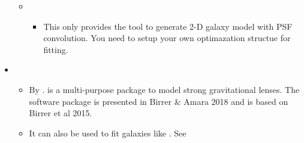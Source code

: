 \documentclass[letterpaper,10pt,english]{sphinxmanual}
\begin{document}
\begin{itemize}
\begin{itemize}
\item {} 
\begin{itemize}
\item {} 
This only provides the tool to generate 2-D galaxy model with
PSF convolution. You need to setup your own optimazation
structue for fitting.

\end{itemize}

\end{itemize}

\item {} 
\begin{itemize}
\item {} 
By .
 is a multi-purpose package to model strong
gravitational lenses. The software package is presented in Birrer
\& Amara 2018 and is based on Birrer et al 2015.

\item {} 
It can also be used to fit galaxies like . See 

\end{itemize}

\end{itemize}
\end{document}
